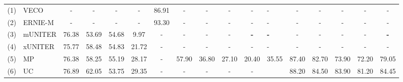 \documentclass{article}
\begin{document}
\begin{table*}[]
{\begin{tabular}{@{}llccccccccclccccl@{}}
(1)       & VECO                     & -              & -              & -              & -              & 86.91          & -                         & -                                  & -                         & -                                  & -                                  & -                         & -                         & -                         & -                         & \multicolumn{1}{c}{-}          \\
(2)       & ERNIE-M                        & -              & -              & -              & -              & 93.30          & -                         & -                                  & -                         & -                                  & -                                  & -                         & -                         & -                         & -                         & \multicolumn{1}{c}{-}          \\
(3)       & mUNITER                        & 76.38          & 53.69          & 54.68          & 9.97           & -              & -                         & -                                  & -                         & \textbf{-}                         & \textbf{-}                         & -                         & -                         & -                         & -                         & \multicolumn{1}{c}{\textbf{-}} \\
(4)       & xUNITER                        & 75.77          & 58.48          & 54.83          & 21.72          & -              & -                         & -                                  & -                         & -                                  & -                                  & -                         & -                         & -                         & -                         & \multicolumn{1}{c}{-}          \\
(5)       & MP                            & 76.38          & 58.25          & 55.19          & 28.17          & -              & 57.90                     & 36.80                              & 27.10                     & 20.40                              & \multicolumn{1}{l}{35.55}          & 87.40                     & 82.70                     & 73.90                     & 72.20                     & 79.05                          \\
(6)       & UC                            & 76.89          & 62.05          & 53.75          & 29.35          & -              & -                         & -                                  & -                         & -                                  & \multicolumn{1}{l}{}               & 88.20                     & 84.50                     & 83.90                     & 81.20                     & 84.45                          \\

\end{tabular}}
\end{table*}
\end{document}
